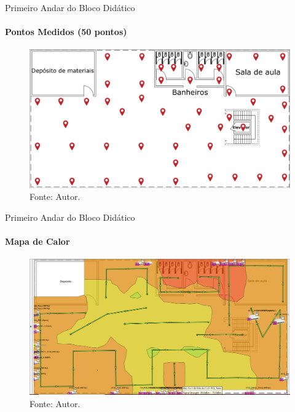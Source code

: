\documentclass[aspectratio=169,12pt]{beamer}
\begin{document}
\begin{frame}{Primeiro Andar do Bloco Didático}
	\framesubtitle{Pontos Medidos (50 pontos)}
	\vspace*{-3mm}
	\begin{figure}[H]
		\centering
		\caption*{{\fontsize{9pt}{11}\selectfont Pontos medidos no 1º andar.}}
		\includegraphics[scale=0.14]{fig_tcc/Pontos_Medidos_Andar01.pdf}
		\caption*{{\fontsize{9pt}{11}\selectfont Fonte: Autor.}}
	\end{figure}
\end{frame}
\begin{frame}{Primeiro Andar do Bloco Didático}
	\framesubtitle{Mapa de Calor}
	\vspace*{-3mm}
	\begin{figure}[H]
		\centering
		\caption*{{\fontsize{9pt}{11}\selectfont Mapa de calor do 1º andar.}}
		\includegraphics[scale=0.28]{fig_tcc/heatmapper_Terreo_Editada.png}
		\caption*{{\fontsize{8pt}{11}\selectfont Fonte: Autor.}}
	\end{figure}
\end{frame}
\end{document}
